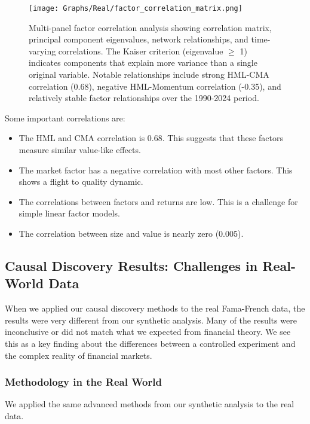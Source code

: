 \begin{figure}[ht]
\centering
\texttt{[image: Graphs/Real/factor\_correlation\_matrix.png]}
\caption{Multi-panel factor correlation analysis showing correlation matrix, principal component eigenvalues, network relationships, and time-varying correlations. The Kaiser criterion (eigenvalue $\geq$ 1) indicates components that explain more variance than a single original variable. Notable relationships include strong HML-CMA correlation (0.68), negative HML-Momentum correlation (-0.35), and relatively stable factor relationships over the 1990-2024 period.}
\label{fig:corr_real}
\end{figure}

Some important correlations are:
\begin{itemize}
    \item The HML and CMA correlation is 0.68. This suggests that these factors measure similar value-like effects.
    \item The market factor has a negative correlation with most other factors. This shows a flight to quality dynamic.
    \item The correlations between factors and returns are low. This is a challenge for simple linear factor models.
    \item The correlation between size and value is nearly zero (0.005).
\end{itemize}

\subsection{Causal Discovery Results: Challenges in Real-World Data}

When we applied our causal discovery methods to the real Fama-French data, the results were very different from our synthetic analysis. Many of the results were inconclusive or did not match what we expected from financial theory. We see this as a key finding about the differences between a controlled experiment and the complex reality of financial markets.

\subsubsection{Methodology in the Real World}

We applied the same advanced methods from our synthetic analysis to the real data.

